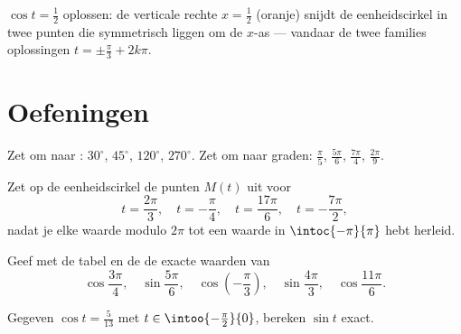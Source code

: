 \begin{omfigure}

{\small $\cos t = \frac12$ oplossen: de verticale rechte $x = \frac12$
(oranje) snijdt de eenheidscirkel in twee punten die symmetrisch liggen om
de $x$-as --- vandaar de twee families oplossingen
$t = \pm\frac\pi3 + 2k\pi$.}
\end{omfigure}

\section{Oefeningen}

\begin{exercise}[$\star$]\label{exo:g11:trigo:1}
Zet om naar : $30^\circ$, $45^\circ$, $120^\circ$, $270^\circ$. Zet
om naar graden: $\frac{\pi}{5}$, $\frac{5\pi}{6}$, $\frac{7\pi}{4}$,
$\frac{2\pi}{9}$.
\end{exercise}

\begin{exercise}[$\star$]\label{exo:g11:trigo:2}
Zet op de eenheidscirkel de punten $M(t)$ uit voor
\[
t = \frac{2\pi}{3},\quad
t = -\frac{\pi}{4},\quad
t = \frac{17\pi}{6},\quad
t = -\frac{7\pi}{2},
\]
nadat je elke waarde modulo $2\pi$ tot een waarde in $\intoc{-\pi}{\pi}$
hebt herleid.
\end{exercise}

\begin{exercise}[$\star$]\label{exo:g11:trigo:3}
Geef met de tabel en de  de exacte waarden van
\[
\cos\frac{3\pi}{4}, \quad
\sin\frac{5\pi}{6}, \quad
\cos\left(-\frac{\pi}{3}\right), \quad
\sin\frac{4\pi}{3}, \quad
\cos\frac{11\pi}{6} .
\]
\end{exercise}

\begin{exercise}[$\star$]\label{exo:g11:trigo:4}
Gegeven $\cos t = \frac{5}{13}$ met $t \in \intoo{-\frac\pi2}{0}$, bereken
$\sin t$ exact.
\end{exercise}


